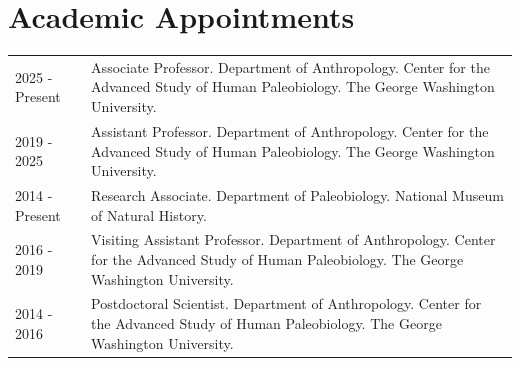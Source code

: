 \documentclass{article}
\begin{document}
\section*{Academic Appointments}
\begin{tabular}{p{}p{}}
2025  - Present & Associate Professor. Department of Anthropology. Center for the Advanced Study of Human Paleobiology. The George Washington University.\\[4pt]
2019 - 2025 & Assistant Professor. Department of Anthropology. Center for the Advanced Study of Human Paleobiology. The George Washington University.\\[4pt]
2014 - Present & Research Associate. Department of Paleobiology.  National Museum of Natural History.\\[4pt]
2016 - 2019 & Visiting Assistant Professor. Department of Anthropology. Center for the Advanced Study of Human Paleobiology. The George Washington University.\\[4pt]
2014 - 2016 & Postdoctoral Scientist. Department of Anthropology. Center for the Advanced Study of Human Paleobiology. The George Washington University. \\[4pt]
\end{tabular} 
\end{document}

